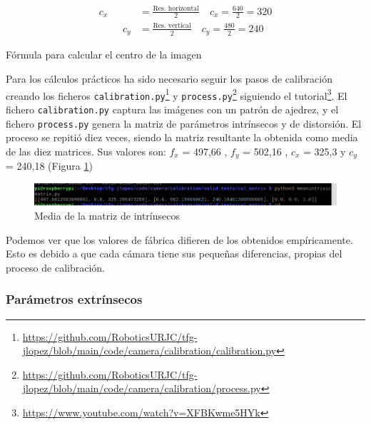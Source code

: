 \begin{myequation}[h]
	\begin{align}
		c_x &= \frac{\text{Res. horizontal}}{2} \quad
		c_x = \frac{640}{2} = 320 
		\nonumber\\
		\hspace{1cm}
		c_y &= \frac{\text{Res. vertical}}{2} \quad
		c_y =  \frac{480}{2} = 240
		\nonumber
	\end{align}
	\caption[Fórmula para calcular el centro de la imagen]{Fórmula para calcular el centro de la imagen}
	\label{ec:cenimagen}
\end{myequation}

Para los cálculos prácticos ha sido necesario seguir los pasos de calibración creando los ficheros \verb|calibration.py|\footnote{\url{https://github.com/RoboticsURJC/tfg-jlopez/blob/main/code/camera/calibration/calibration.py}} y \verb|process.py|\footnote{\url{https://github.com/RoboticsURJC/tfg-jlopez/blob/main/code/camera/calibration/process.py}} siguiendo el tutorial\footnote{\url{https://www.youtube.com/watch?v=XFBKwme5HYk}}. El fichero \verb|calibration.py| captura las imágenes con un patrón de ajedrez, y el fichero \verb|process.py| genera la matriz de parámetros intrínsecos y de distorsión. El proceso se repitió diez veces, siendo la matriz resultante la obtenida como media de las diez matrices. Sus valores son: $f_x$ = 497,66 , $f_y$ = 502,16 , $c_x$ = 325,3 y $c_y$ = 240,18 (Figura \ref{fig:meanintrinseco})

 \begin{figure} [h!]
	\begin{center}
		\includegraphics[width=15cm]{figs/cap6/intrinsicmedia.png}
	\end{center}
	\caption{Media de la matriz de intrínsecos}
	\label{fig:meanintrinseco}
\end{figure}


Podemos ver que los valores de fábrica difieren de los obtenidos empíricamente. Esto es debido a que cada cámara tiene sus pequeñas diferencias, propias del proceso de calibración.


\subsubsection{Parámetros extrínsecos}
\label{subsubsec:extrinsecoscamara}

